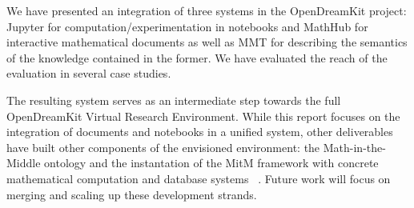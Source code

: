 We have presented an integration of three systems in the OpenDreamKit project:
Jupyter for computation/experimentation in notebooks and MathHub for interactive mathematical documents as well as MMT for describing the semantics of the knowledge contained in the former.
We have evaluated the reach of the evaluation in several case studies.

The resulting system serves as an intermediate step towards the full OpenDreamKit Virtual Research Environment.
While this report focuses on the integration of documents and notebooks in a unified system, other deliverables have built other components of the envisioned environment: the Math-in-the-Middle ontology \cite{ODK-D6.8} and the instantation of the MitM framework with concrete mathematical computation and database systems ~\cite{ODK-D6.5}.
Future work will focus on merging and scaling up these development strands.


